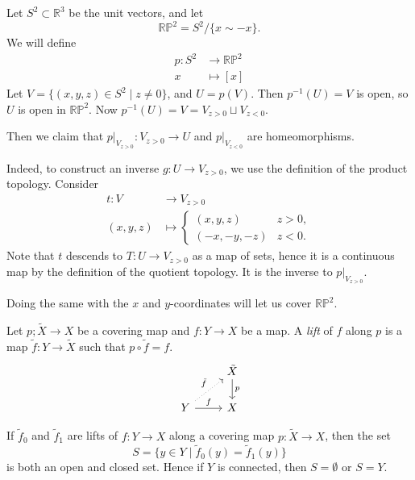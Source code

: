 \documentclass[12pt]{article}
\begin{document}
\begin{exbox}
	Let $S^2 \subset \mathbb{R}^3$ be the unit vectors, and let
	\[
		\mathbb{RP}^2 = S^2/\{x \sim -x\}.
	\]
	We will define
	\begin{align*}
		p : S^2 &\to \mathbb{RP}^2 \\
		x &\mapsto [x]
	\end{align*}
	Let $V = \{(x, y, z) \in S^2 \mid z \neq 0\}$, and $U = p(V)$. Then $p^{-1}(U) = V$ is open, so $U$ is open in $\mathbb{RP}^2$. Now $p^{-1}(U) = V = V_{z > 0} \sqcup V_{z < 0}$.

	Then we claim that $p|_{V_{z > 0}} : V_{z > 0} \to U$ and $p|_{V_{z < 0}}$ are homeomorphisms.

	Indeed, to construct an inverse $g : U \to V_{z > 0}$, we use the definition of the product topology. Consider
	\begin{align*}
		t : V &\to V_{z > 0}\\
		(x, y, z) &\mapsto
		\begin{cases}
			(x, y, z) & z > 0,\\
			(-x,-y,-z) & z < 0.
		\end{cases}
	\end{align*}
	Note that $t$ descends to $T : U \to V_{z > 0}$ as a map of sets, hence it is a continuous map by the definition of the quotient topology. It is the inverse to $p|_{V_{z > 0}}$.

	Doing the same with the $x$ and $y$-coordinates will let us cover $\mathbb{RP}^2$.
\end{exbox}


\begin{definition}
	Let $p ; \tilde X \to X$ be a covering map and $f : Y \to X$ be a map. A \emph{lift} of $f$ along $p$ is a map $\tilde f : Y \to \tilde X$ such that $p \circ \tilde f = f$.
	\[
	\begin{tikzcd}
		& \tilde X \arrow[d, "p"] \\
		Y \arrow[ur, dotted, "\tilde f"] \arrow[r, "f"] & X
	\end{tikzcd}
	\]
\end{definition}

\begin{lemma}
	If $\tilde f_0$ and $\tilde f_1$ are lifts of $f : Y \to X$ along a covering map $p : \tilde X \to X$, then the set
	\[
		S = \{y \in Y \mid \tilde f_0(y) = \tilde f_1(y)\}
	\]
	is both an open and closed set. Hence if $Y$ is connected, then $S = \emptyset$ or $S = Y$.
\end{lemma}
\end{document}

